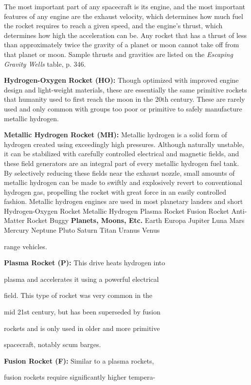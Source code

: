 The most important part of any spacecraft is its engine, 
and the most important features of any engine are 
the exhaust velocity, which determines how much 
fuel the rocket requires to reach a given speed, and 
the engine's thrust, which determines how high the 
acceleration can be. Any rocket that has a thrust of 
less than approximately twice the gravity of a planet 
or moon cannot take off from that planet or moon. 
Sample thrusts and gravities are listed on the \textit{Escaping }
\textit{Gravity Wells} table, p. 346.

\textbf{Hydrogen-Oxygen Rocket (HO):} Though optimized
with improved engine design and light-weight
materials, these are essentially the same primitive 
rockets that humanity used to first reach the moon 
in the 20th century. These are rarely used and only 
common with groups too poor or primitive to safely 
manufacture metallic hydrogen.

\textbf{Metallic Hydrogen Rocket (MH):} Metallic hydrogen
is a solid form of hydrogen created using exceedingly
high pressures. Although naturally unstable, it
can be stabilized with carefully controlled electrical 
and magnetic fields, and these field generators are 
an integral part of every metallic hydrogen fuel tank. 
By selectively reducing these fields near the exhaust 
nozzle, small amounts of metallic hydrogen can be 
made to swiftly and explosively revert to conventional 
hydrogen gas, propelling the rocket with great force 
in an easily controlled fashion. Metallic hydrogen 
engines are used in most planetary landers and short 
Hydrogen-Oxygen Rocket
Metallic Hydrogen
Plasma Rocket
Fusion Rocket
Anti-Matter
Rocket Buggy
\textbf{Planets, Moons, Etc.}
Earth
Europa
Jupiter
Luna
Mars
Mercury
Neptune
Pluto
Saturn
Titan
Uranus
Venus

range vehicles.

\textbf{Plasma Rocket (P):} This drive heats hydrogen into 

plasma and accelerates it using a powerful electrical 

field. This type of rocket was very common in the 

mid 21st century, but has been superseded by fusion 

rockets and is only used in older and more primitive 

spacecraft, notably scum barges.

\textbf{Fusion Rocket (F):} Similar to a plasma rockets, 

fusion rockets require significantly higher tempera-

